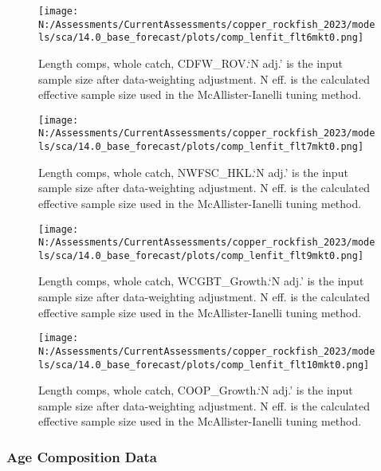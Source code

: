 \documentclass[11pt,
  english,
  letterpaper,
]{article}
\begin{document}
\begin{figure}
\centering
\texttt{[image: N:/Assessments/CurrentAssessments/copper\_rockfish\_2023/models/sca/14.0\_base\_forecast/plots/comp\_lenfit\_flt6mkt0.png]}
\caption{Length comps, whole catch, CDFW\_ROV.`N adj.' is the input sample size after data-weighting adjustment. N eff. is the calculated effective sample size used in the McAllister-Ianelli tuning method.\label{fig:comp_lenfit_flt6mkt0}}
\end{figure}

\begin{figure}
\centering
\texttt{[image: N:/Assessments/CurrentAssessments/copper\_rockfish\_2023/models/sca/14.0\_base\_forecast/plots/comp\_lenfit\_flt7mkt0.png]}
\caption{Length comps, whole catch, NWFSC\_HKL.`N adj.' is the input sample size after data-weighting adjustment. N eff. is the calculated effective sample size used in the McAllister-Ianelli tuning method.\label{fig:comp_lenfit_flt7mkt0}}
\end{figure}

\begin{figure}
\centering
\texttt{[image: N:/Assessments/CurrentAssessments/copper\_rockfish\_2023/models/sca/14.0\_base\_forecast/plots/comp\_lenfit\_flt9mkt0.png]}
\caption{Length comps, whole catch, WCGBT\_Growth.`N adj.' is the input sample size after data-weighting adjustment. N eff. is the calculated effective sample size used in the McAllister-Ianelli tuning method.\label{fig:comp_lenfit_flt9mkt0}}
\end{figure}

\begin{figure}
\centering
\texttt{[image: N:/Assessments/CurrentAssessments/copper\_rockfish\_2023/models/sca/14.0\_base\_forecast/plots/comp\_lenfit\_flt10mkt0.png]}
\caption{Length comps, whole catch, COOP\_Growth.`N adj.' is the input sample size after data-weighting adjustment. N eff. is the calculated effective sample size used in the McAllister-Ianelli tuning method.\label{fig:comp_lenfit_flt10mkt0}}
\end{figure}

\newpage

\hypertarget{age-data}{%
\subsubsection{Age Composition Data}\label{age-data}}
\end{document}
